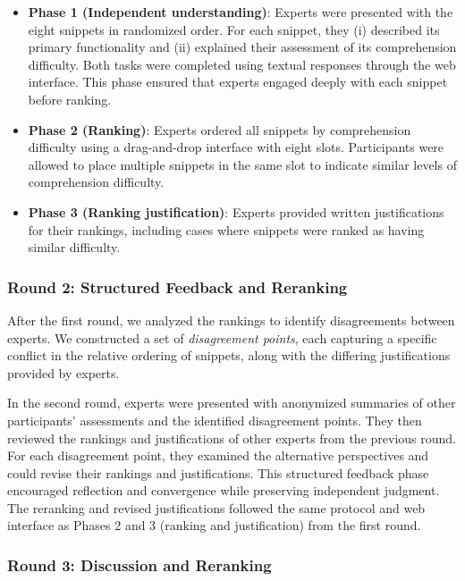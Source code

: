 \begin{itemize}
	
	\item \textbf{Phase 1 (Independent understanding)}: Experts were presented with the eight snippets in randomized order. For each snippet, they (i) described its primary functionality and (ii) explained their assessment of its comprehension difficulty. Both tasks were completed using textual responses through the web interface. This phase ensured that experts engaged deeply with each snippet before ranking.

	\item \textbf{Phase 2 (Ranking)}: Experts ordered all snippets by comprehension difficulty using a drag-and-drop interface with eight slots.
Participants were allowed to place multiple snippets in the same slot to indicate similar levels of comprehension difficulty.

	\item \textbf{Phase 3 (Ranking justification)}: Experts provided written justifications for their rankings, including cases where snippets were ranked as having similar difficulty.


\end{itemize}

\subsubsection{Round 2: Structured Feedback and Reranking}

After the first round, we analyzed the rankings to identify disagreements between experts. We constructed a set of \emph{disagreement points}, each capturing a specific conflict in the relative ordering of snippets, along with the differing justifications provided by experts.

In the second round, experts were presented with anonymized summaries of other participants’ assessments and the identified disagreement points. They then reviewed the rankings and justifications of other experts from the previous round. For each disagreement point, they examined the alternative perspectives and could revise their rankings and justifications. This structured feedback phase encouraged reflection and convergence while preserving independent judgment.
The reranking and revised justifications followed the same protocol and web interface as Phases 2 and 3 (ranking and justification) from the first round.


\subsubsection{Round 3: Discussion and Reranking}

